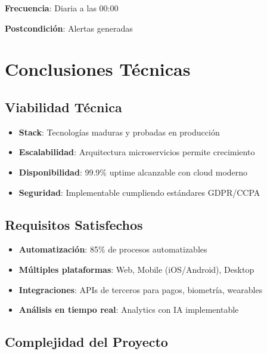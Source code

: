 \documentclass[11pt,a4paper]{article}
\begin{document}
\begin{itemize}
\begin{definicion}
\textbf{Frecuencia}: Diaria a las 00:00

\textbf{Postcondición}: Alertas generadas
\end{definicion}

\section{Conclusiones Técnicas}

\subsection{Viabilidad Técnica}

\begin{itemize}
    \item \textbf{Stack}: Tecnologías maduras y probadas en producción
    \item \textbf{Escalabilidad}: Arquitectura microservicios permite crecimiento
    \item \textbf{Disponibilidad}: 99.9\% uptime alcanzable con cloud moderno
    \item \textbf{Seguridad}: Implementable cumpliendo estándares GDPR/CCPA
\end{itemize}

\subsection{Requisitos Satisfechos}

\begin{itemize}
    \item \textbf{Automatización}: 85\% de procesos automatizables
    \item \textbf{Múltiples plataformas}: Web, Mobile (iOS/Android), Desktop
    \item \textbf{Integraciones}: APIs de terceros para pagos, biometría, wearables
    \item \textbf{Análisis en tiempo real}: Analytics con IA implementable
\end{itemize}

\subsection{Complejidad del Proyecto}


\end{itemize}
\end{document}
